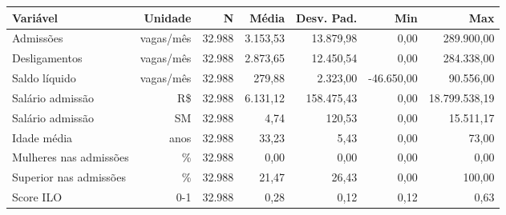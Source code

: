 \scriptsize
\begin{tabular}{lrrrrrr}
\toprule
Variável & Unidade & N & Média & Desv. Pad. & Min & Max \\
\midrule
Admissões & vagas/mês & 32.988 & 3.153,53 & 13.879,98 & 0,00 & 289.900,00 \\
Desligamentos & vagas/mês & 32.988 & 2.873,65 & 12.450,54 & 0,00 & 284.338,00 \\
Saldo líquido & vagas/mês & 32.988 & 279,88 & 2.323,00 & -46.650,00 & 90.556,00 \\
Salário admissão & R\$ & 32.988 & 6.131,12 & 158.475,43 & 0,00 & 18.799.538,19 \\
Salário admissão & SM & 32.988 & 4,74 & 120,53 & 0,00 & 15.511,17 \\
Idade média & anos & 32.988 & 33,23 & 5,43 & 0,00 & 73,00 \\
Mulheres nas admissões & \% & 32.988 & 0,00 & 0,00 & 0,00 & 0,00 \\
Superior nas admissões & \% & 32.988 & 21,47 & 26,43 & 0,00 & 100,00 \\
Score ILO & 0-1 & 32.988 & 0,28 & 0,12 & 0,12 & 0,63 \\
\bottomrule
\end{tabular}
